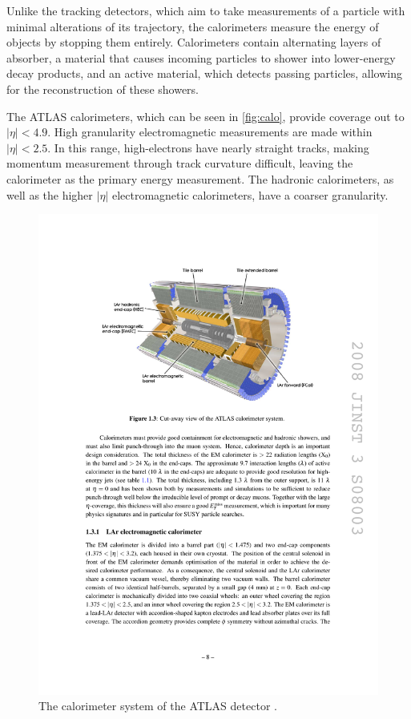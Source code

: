 Unlike the tracking detectors, which aim to take measurements of a particle with minimal alterations of its trajectory, the calorimeters measure the energy of objects by stopping them entirely. Calorimeters contain alternating layers of absorber, a material that causes incoming particles to shower into lower-energy decay products, and an active material, which detects passing particles, allowing for the reconstruction of these showers.

The \ac{ATLAS} calorimeters, which can be seen in \autoref{fig:calo}, provide coverage out to $|\eta| < 4.9$. High granularity electromagnetic measurements are made within $|\eta| < 2.5$. In this range, high-\pt electrons have nearly straight tracks, making momentum measurement through track curvature difficult, leaving the calorimeter as the primary energy measurement. The hadronic calorimeters, as well as the higher $|\eta|$ electromagnetic calorimeters, have a coarser granularity. 

\begin{centering}
\begin{figure}[!htb]
\myfloatalign
\includegraphics[width=.90\linewidth]{figures/atlas/calorimeters.pdf}
\caption{The calorimeter system of the \ac{ATLAS} detector \cite{PERF-2007-01}.}
\label{fig:calo}
\end{figure}
\end{centering}

